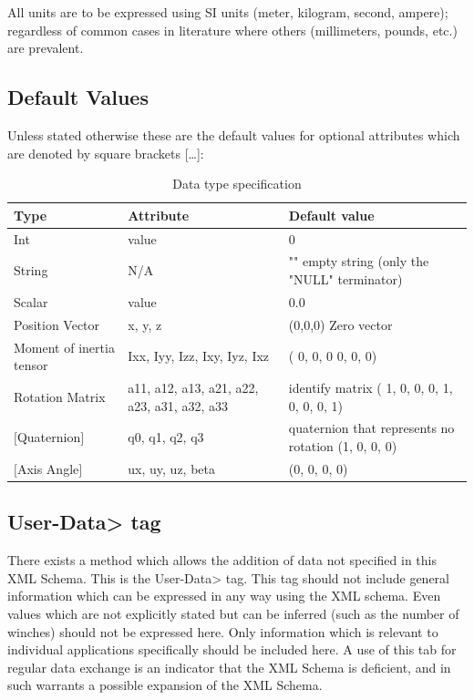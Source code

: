 All units are to be expressed using SI units (meter, kilogram, second, ampere);
regardless of common cases in literature where others (millimeters, pounds,
etc.) are prevalent.

\subsection{Default Values}%
Unless stated otherwise these are the default values for optional attributes
which are denoted by square brackets [\ldots]:
\begin{table}
  \centering
  \caption{Data type specification}
  \label{tab:XmlDefaultValues}
  \begin{tabular}{p{}p{}p{}}
    \hline\hline
    Type  &  Attribute  & Default value\\
    \hline
    Int & value & 0\\
    String & N/A  &  "" empty string (only the "NULL" terminator) \\
    Scalar & value &  0.0\\
    Position Vector & x, y, z & (0,0,0) Zero vector\\
    Moment of inertia tensor  &  Ixx, Iyy, Izz, Ixy, Iyz, Ixz & ( 0, 0, 0
    0, 0, 0)\\
    Rotation Matrix & a11, a12, a13, a21, a22, a23, a31, a32, a33 & identify matrix ( 1, 0, 0, 0, 1, 0, 0, 0, 1)\\
    $[$Quaternion$]$ & q0, q1, q2, q3 & quaternion that represents no rotation (1, 0, 0, 0)\\
    $[$Axis Angle$]$ & ux, uy, uz, beta & (0, 0, 0, 0)\\
    \hline\hline
  \end{tabular}
\end{table}

\subsection{\<User-Data> tag}%
There exists a method which allows the addition of data not specified in this
XML Schema. This is the \<User-Data> tag. This tag should not include general
information which can be expressed in any way using the XML schema. Even values
which are not explicitly stated but can be inferred (such as the number of
winches) should not be expressed here. Only information which is relevant to
individual applications specifically should be included here. A use of this tab
for regular data exchange is an indicator that the XML Schema is deficient, and
in such warrants a possible expansion of the XML Schema.

